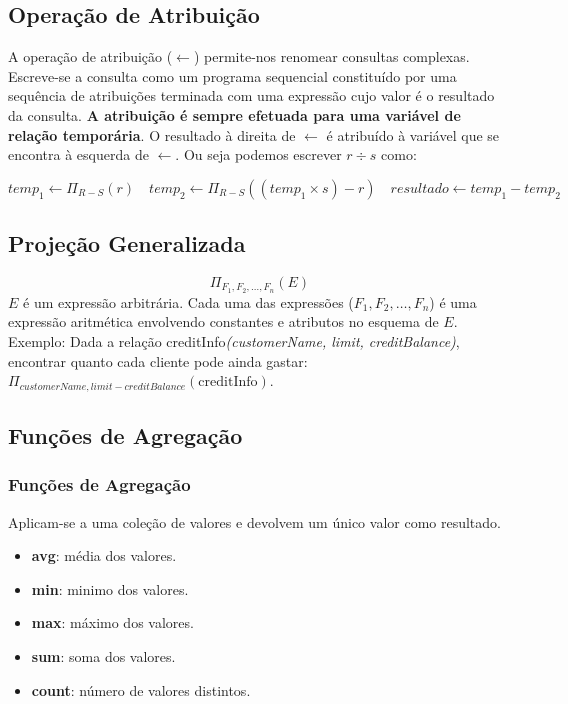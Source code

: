 \documentclass{article}
\begin{document}
\subsection{Operação de Atribuição}
A operação de atribuição ($\leftarrow$) permite-nos renomear consultas complexas. Escreve-se a consulta como um programa sequencial constituído por uma sequência de atribuições terminada com uma expressão cujo valor é o resultado da consulta. \textbf{A atribuição é sempre efetuada para uma variável de relação temporária}. O resultado à direita de $\leftarrow$ é atribuído à variável que se encontra à esquerda de $\leftarrow$. Ou seja podemos escrever $r \div s$ como:

\[
  temp_1 \leftarrow \Pi_{R-S}(r) \quad
  temp_2 \leftarrow \Pi_{R-S}((temp_1 \times s) - r) \quad
  resultado \leftarrow temp_1 - temp_2
\]

\subsection{Projeção Generalizada}
\[
  \Pi_{F_1,F_2,\dots ,F_n}(E)
\]
$E$ é um expressão arbitrária. Cada uma das expressões ($F_1,F_2,\dots ,F_n$) é uma expressão aritmética envolvendo constantes e atributos no esquema de $E$. Exemplo: Dada a relação creditInfo\textit{(customerName, limit, creditBalance)}, encontrar quanto cada cliente pode ainda gastar:
$\Pi_{customerName, limit - creditBalance}(\textrm{creditInfo}) $.

\subsection{Funções de Agregação}
\subsubsection*{Funções de Agregação}
Aplicam-se a uma coleção de valores e devolvem um único valor como resultado.
\begin{itemize}
  \item \textbf{avg}: média dos valores.
  \item \textbf{min}: minimo dos valores.
  \item  \textbf{max}: máximo dos valores.
  \item  \textbf{sum}: soma dos valores.
  \item  \textbf{count}: número de valores distintos.
\end{itemize}
\end{document}
